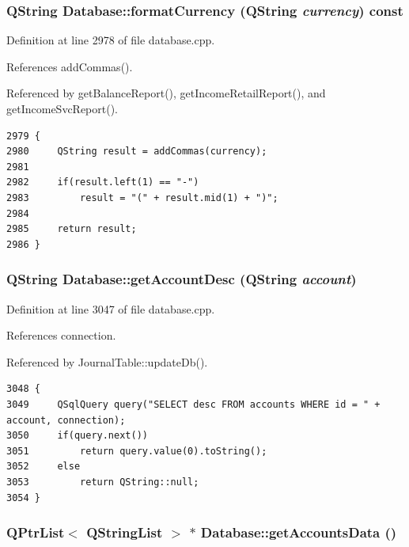 \hypertarget{classDatabase_a49}{
\subsubsection[formatCurrency]{\setlength{\rightskip}{0pt plus 5cm}QString Database::format\-Currency (QString {\em currency}) const}}
\label{classDatabase_a49}


Definition at line 2978 of file database.cpp.

References add\-Commas().

Referenced by get\-Balance\-Report(), get\-Income\-Retail\-Report(), and get\-Income\-Svc\-Report().

\footnotesize\begin{verbatim}2979 {
2980     QString result = addCommas(currency);
2981 
2982     if(result.left(1) == "-")
2983         result = "(" + result.mid(1) + ")";
2984 
2985     return result;
2986 }
\end{verbatim}\normalsize 


\hypertarget{classDatabase_a54}{
\subsubsection[getAccountDesc]{\setlength{\rightskip}{0pt plus 5cm}QString Database::get\-Account\-Desc (QString {\em account})}}
\label{classDatabase_a54}


Definition at line 3047 of file database.cpp.

References connection.

Referenced by Journal\-Table::update\-Db().

\footnotesize\begin{verbatim}3048 {
3049     QSqlQuery query("SELECT desc FROM accounts WHERE id = " + account, connection);
3050     if(query.next())
3051         return query.value(0).toString();
3052     else
3053         return QString::null;
3054 }
\end{verbatim}\normalsize 


\hypertarget{classDatabase_a37}{
\subsubsection[getAccountsData]{\setlength{\rightskip}{0pt plus 5cm}QPtr\-List$<$ QString\-List $>$ $\ast$ Database::get\-Accounts\-Data ()}}
\label{classDatabase_a37}


